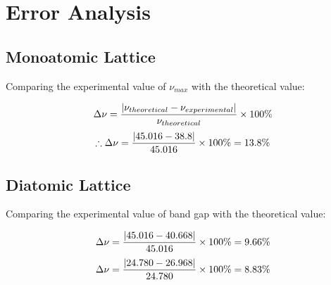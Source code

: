 \section{Error Analysis}
	\subsection{Monoatomic Lattice}
		Comparing the experimental value of $\nu_{max}$ with the theoretical value:

		$$\Delta\nu = \frac{\abs{\nu_{theoretical} - \nu_{experimental}}}{\nu_{theoretical}}\times100\%$$
		$$\therefore\Delta\nu = \frac{\abs{45.016 - 38.8}}{45.016}\times100\% = 13.8\%$$

	\subsection{Diatomic Lattice}
		Comparing the experimental value of band gap with the theoretical value:

		$$\Delta\nu = \frac{\abs{45.016 - 40.668}}{45.016}\times100\% = 9.66\%$$
		$$\Delta\nu = \frac{\abs{24.780 - 26.968}}{24.780}\times100\% = 8.83\%$$